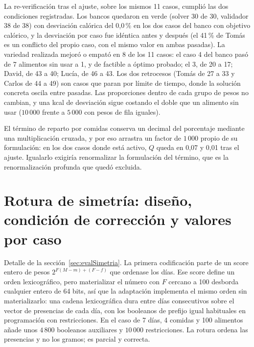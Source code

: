 La re-verificación tras el ajuste, sobre los mismos 11 casos, cumplió las dos condiciones registradas. Los bancos quedaron en verde (solver 30 de 30, validador 38 de 38) con desviación calórica del 0,0\,\% en los dos casos del banco con objetivo calórico, y la desviación por caso fue idéntica antes y después (el 41\,\% de Tomás es un conflicto del propio caso, con el mismo valor en ambas pasadas). La variedad realizada mejoró o empató en 8 de los 11 casos: el caso 4 del banco pasó de 7 alimentos sin usar a 1, y de factible a óptimo probado; el 3, de 20 a 17; David, de 43 a 40; Lucía, de 46 a 43. Los dos retrocesos (Tomás de 27 a 33 y Carlos de 44 a 49) son casos que paran por límite de tiempo, donde la solución concreta oscila entre pasadas. Las proporciones dentro de cada grupo de pesos no cambian, y una kcal de desviación sigue costando el doble que un alimento sin usar ($10\,000$ frente a $5\,000$ con pesos de fila iguales).

El término de reparto por comidas conserva un decimal del porcentaje mediante una multiplicación cruzada, y por eso arrastra un factor de $1\,000$ propio de su formulación: en los dos casos donde está activo, $Q$ queda en 0,07 y 0,01 tras el ajuste. Igualarlo exigiría renormalizar la formulación del término, que es la renormalización profunda que quedó excluida.

\section{Rotura de simetría: diseño, condición de corrección y valores por caso}
\label{sec:anexoSimetria}

Detalle de la sección~\ref{sec:evalSimetria}. La primera codificación parte de un score entero de pesos $2^{F(M-m)+(F-f)}$ que ordenase los días. Ese score define un orden lexicográfico, pero materializar el número con $F$ cercano a 100 desborda cualquier entero de 64 bits, así que la adaptación implementa el mismo orden sin materializarlo: una cadena lexicográfica dura entre días consecutivos sobre el vector de presencias de cada día, con los booleanos de prefijo igual habituales en programación con restricciones. En el caso de 7 días, 4 comidas y 100 alimentos añade unos $4\,800$ booleanos auxiliares y $10\,000$ restricciones. La rotura ordena las presencias y no los gramos; es parcial y correcta.

